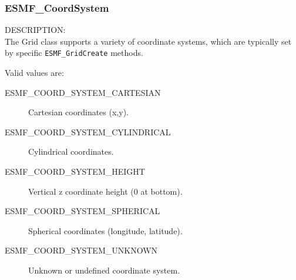  \subsubsection{ESMF\_CoordSystem}

 {\sf DESCRIPTION:\\}
 The Grid class supports a variety of coordinate systems, which are typically
 set by specific {\tt ESMF\_GridCreate} methods.

 Valid values are:
 \begin{description}
    \item [ESMF\_COORD\_SYSTEM\_CARTESIAN]
          Cartesian coordinates (x,y).

    \item [ESMF\_COORD\_SYSTEM\_CYLINDRICAL] 
          Cylindrical coordinates.

    \item [ESMF\_COORD\_SYSTEM\_HEIGHT]
          Vertical z coordinate height (0 at bottom).

    \item [ESMF\_COORD\_SYSTEM\_SPHERICAL]
          Spherical coordinates (longitude, latitude).

    \item [ESMF\_COORD\_SYSTEM\_UNKNOWN]
          Unknown or undefined coordinate system.

 \end{description}


